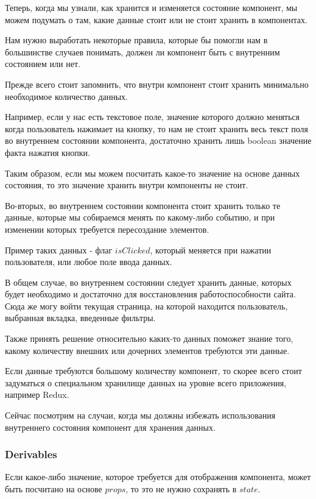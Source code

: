 Теперь, когда мы узнали, как хранится и изменяется состояние компонент, мы можем подумать о там, какие данные стоит или не стоит хранить в компонентах.

Нам нужно выработать некоторые правила, которые бы помогли нам в большинстве случаев понимать, должен ли компонент быть с внутренним состоянием или нет. 

Прежде всего стоит запомнить, что внутри компонент стоит хранить минимально необходимое количество данных.

Например, если у нас есть текстовое поле, значение которого должно меняться когда пользователь нажимает на кнопку, то нам не стоит хранить весь текст поля во внутреннем состоянии компонента, достаточно хранить лишь boolean значение факта нажатия кнопки.

Таким образом, если мы можем посчитать какое-то значение на основе данных состояния, то это значение хранить внутри компоненты не стоит.

Во-вторых, во внутреннем состоянии компонента стоит хранить только те данные, которые мы собираемся менять по какому-либо событию, и при изменении которых требуется пересоздание элементов. 

Пример таких данных - флаг $isClicked$, который меняется при нажатии пользователя, или любое поле ввода данных.

В общем случае, во внутреннем состоянии следует хранить данные, которых будет необходимо и достаточно для восстановления работоспособности сайта. Сюда же могу войти текущая страница, на которой находится пользователь, выбранная вкладка, введенные фильтры.

Также принять решение относительно каких-то данных поможет знание того, какому количеству внешних или дочерних элементов требуются эти данные.

Если данные требуются большому количеству компонент, то скорее всего стоит задуматься о специальном хранилище данных на уровне всего приложения, например Redux.

Сейчас посмотрим на случаи, когда мы должны избежать использования внутреннего состояния компонент для хранения данных.

\subsubsection*{Derivables}

Если какое-либо значение, которое требуется для отображения компонента, может быть посчитано на основе $props$, то это не нужно сохранять в $state$.

